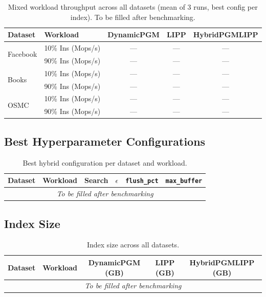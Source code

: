 \documentclass[11pt]{article}
\begin{document}
\begin{table}[h]
\centering
\begin{tabular}{llccc}
\toprule
Dataset & Workload & DynamicPGM & LIPP & \textbf{HybridPGMLIPP} \\
\midrule
\multirow{2}{*}{Facebook}
  & 10\% Ins (Mops/s) & --- & --- & --- \\
  & 90\% Ins (Mops/s) & --- & --- & --- \\
\midrule
\multirow{2}{*}{Books}
  & 10\% Ins (Mops/s) & --- & --- & --- \\
  & 90\% Ins (Mops/s) & --- & --- & --- \\
\midrule
\multirow{2}{*}{OSMC}
  & 10\% Ins (Mops/s) & --- & --- & --- \\
  & 90\% Ins (Mops/s) & --- & --- & --- \\
\bottomrule
\end{tabular}
\caption{Mixed workload throughput across all datasets (mean of 3 runs, best config per index). To be filled after benchmarking.}
\label{tab:throughput}
\end{table}

\subsection{Best Hyperparameter Configurations}

\begin{table}[h]
\centering
\small
\begin{tabular}{llcccc}
\toprule
Dataset & Workload & Search & $\epsilon$ & \texttt{flush\_pct} & \texttt{max\_buffer} \\
\midrule
\multicolumn{6}{c}{\emph{To be filled after benchmarking}} \\
\bottomrule
\end{tabular}
\caption{Best hybrid configuration per dataset and workload.}
\label{tab:configs}
\end{table}

\subsection{Index Size}

\begin{table}[h]
\centering
\begin{tabular}{llccc}
\toprule
Dataset & Workload & DynamicPGM (GB) & LIPP (GB) & HybridPGMLIPP (GB) \\
\midrule
\multicolumn{5}{c}{\emph{To be filled after benchmarking}} \\
\bottomrule
\end{tabular}
\caption{Index size across all datasets.}
\label{tab:size}
\end{table}
\end{document}

